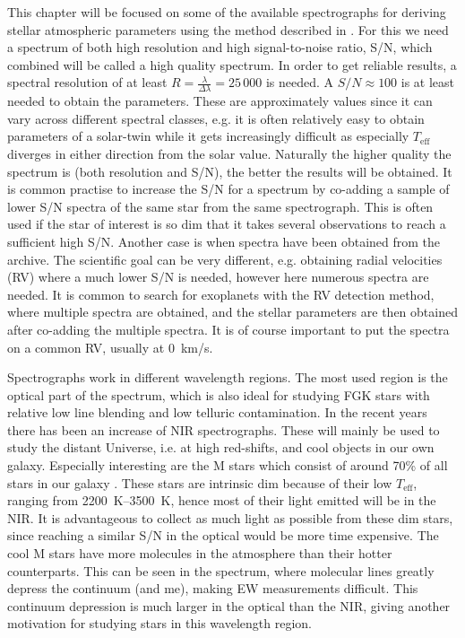 This chapter will be focused on some of the available spectrographs for deriving
stellar atmospheric parameters using the method described in
. For this we need a spectrum of both high resolution and
high signal-to-noise ratio, S/N, which combined will be called a high quality
spectrum. In order to get reliable results, a spectral resolution of at least
$R=\frac{\lambda}{\Delta\lambda}=25\,000$ is needed. A $S/N\approx 100$ is at
least needed to obtain the parameters. These are approximately values since it
can vary across different spectral classes, e.g. it is often relatively easy to
obtain parameters of a solar-twin while it gets increasingly difficult as
especially $T_\mathrm{eff}$ diverges in either direction from the solar value.
Naturally the higher quality the spectrum is (both resolution and S/N), the
better the results will be obtained. It is common practise to increase the S/N
for a spectrum by co-adding a sample of lower S/N spectra of the same star from
the same spectrograph. This is often used if the star of interest is so dim that
it takes several observations to reach a sufficient high S/N. Another case is
when spectra have been obtained from the archive. The scientific goal can be
very different, e.g. obtaining radial velocities (RV) where a much lower S/N is
needed, however here numerous spectra are needed. It is common to search for
exoplanets with the RV detection method, where multiple spectra are obtained,
and the stellar parameters are then obtained after co-adding the multiple
spectra. It is of course important to put the spectra on a common RV, usually at
\SI{0}{km/s}.

Spectrographs work in different wavelength regions. The most used region is the
optical part of the spectrum, which is also ideal for studying FGK stars with
relative low line blending and low telluric contamination. In the recent years
there has been an increase of NIR spectrographs. These will mainly be used to
study the distant Universe, i.e. at high red-shifts, and cool objects in our own
galaxy. Especially interesting are the M stars which consist of around 70\% of
all stars in our galaxy \citep{Bochanski2010}. These stars are intrinsic dim
because of their low $T_\mathrm{eff}$, ranging from \SIrange{2200}{3500}{K},
hence most of their light emitted will be in the NIR. It is advantageous to
collect as much light as possible from these dim stars, since reaching a similar
S/N in the optical would be more time expensive. The cool M stars have more
molecules in the atmosphere than their hotter counterparts. This can be seen in
the spectrum, where molecular lines greatly depress the continuum (and
me), making EW measurements difficult. This
continuum depression is much larger in the optical than the NIR, giving another
motivation for studying stars in this wavelength region.
